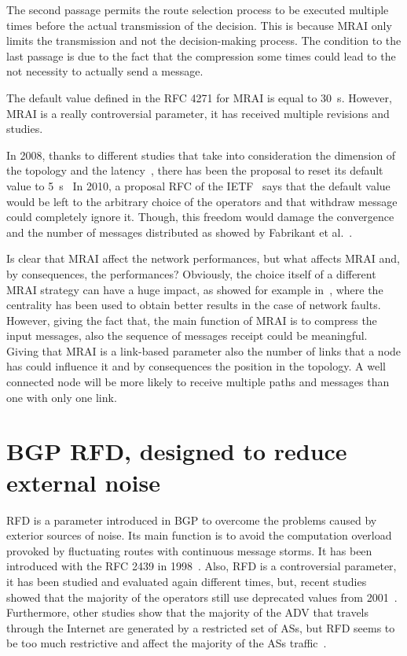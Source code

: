 The second passage permits the route selection process to be executed multiple
times before the actual transmission of the decision.
This is because \ac{MRAI} only limits the transmission and not the decision-making process.
The condition to the last passage is due to the fact that the compression some
times could lead to the not necessity to actually send a message.

The default value defined in the \ac{RFC} \num{4271} for \ac{MRAI} is equal to
\SI{30}{\second}.
However, \ac{MRAI} is a really controversial parameter, it has received multiple
revisions and studies.

In \num{2008}, thanks to different studies that take into consideration the
dimension of the topology and the latency~\cite{qiu2005optimal}, there has been
the proposal to reset its default value to \SI{5}{\second}~\cite{jakma2008revised}
In \num{2010}, a proposal \ac{RFC} of the \ac{IETF}~\cite{jakma2010revisions}
says that the default value would be left to the arbitrary choice of the operators and
that withdraw message could completely ignore it.
Though, this freedom would damage the convergence and the number of messages distributed
as showed by Fabrikant et al.~\cite{fabrikant2011there}.

Is clear that \ac{MRAI} affect the network performances, but what affects \ac{MRAI}
and, by consequences, the performances?
Obviously, the choice itself of a different \ac{MRAI} strategy can have a huge
impact, as showed for example in~\cite{milani2019BGP}, where the centrality
has been used to obtain better results in the case of network faults.
However, giving the fact that, the main function of \ac{MRAI} is to compress the
input messages, also the sequence of messages receipt could be meaningful.
Giving that \ac{MRAI} is a link-based parameter also the number of links that
a node has could influence it and by consequences the position in the topology.
A well connected node will be more likely to receive multiple paths and messages
than one with only one link.

\section{BGP RFD, designed to reduce external noise}
\label{sec:bgp_rfd}

\ac{RFD} is a parameter introduced in \ac{BGP} to overcome the problems caused
by exterior sources of noise.
Its main function is to avoid the computation overload provoked by fluctuating
routes with continuous message storms.
It has been introduced with the \ac{RFC} \num{2439} in \num{1998}~\cite{rfc2439}.
Also, \ac{RFD} is a controversial parameter, it has been studied and evaluated again
different times, but, recent studies showed that the majority of the operators
still use deprecated values from \num{2001}~\cite{gray2020bgp}.
Furthermore, other studies show that the majority of the \ac{ADV} that travels
through the Internet are generated by a restricted set of \acp{AS}, but \ac{RFD}
seems to be too much restrictive and affect the majority of the \acp{AS} traffic~\cite{pelsser2011route}.

